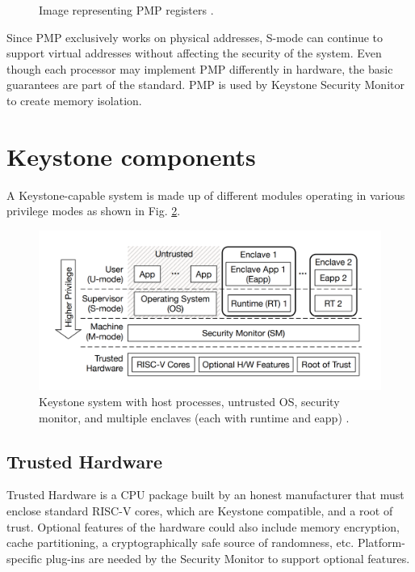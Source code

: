 \begin{figure}[h!]
    \centering
    
    \caption{Image representing PMP registers \cite{keystone-doc}.}
    \label{pmp-img}
\end{figure}

Since PMP exclusively works on physical addresses, S-mode can continue to support virtual addresses without affecting the security of the system. Even though each processor may implement PMP differently in hardware, the basic guarantees are part of the standard. PMP is used by Keystone Security Monitor to create memory isolation.


\section{Keystone components}
\label{keystone-components}
A Keystone-capable system is made up of different modules operating in various privilege modes as shown in Fig. \ref{keystoneComponents}.

\begin{figure}[h!]
    \centering
    \includegraphics[scale=0.35]{./chapters/images/keystone-components.png}
    \caption{Keystone system with host processes, untrusted OS, security monitor, and multiple enclaves (each with runtime and eapp) \cite{lee2020keystone}.}
    \label{keystoneComponents}
\end{figure}
\subsection*{Trusted Hardware}
Trusted Hardware is a CPU package built by an honest manufacturer that must enclose standard RISC-V cores, which are Keystone compatible, and a root of trust. Optional features of the hardware could also include memory encryption, cache partitioning, a cryptographically safe source of randomness, etc. Platform-specific plug-ins are needed by the Security Monitor to support optional features.
